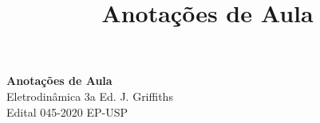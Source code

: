 \documentclass[11pt]{article}%
\theoremstyle{definition}
\begin{document}

\newcommand{\nota}[1]{%
\textcolor{red}{
#1
}}
\newcommand{\titulo}{Anotações de Aula}
\newcommand{\griffiths}{Eletrodinâmica 3a Ed. J. Griffiths}

\title{\titulo}

\thispagestyle{empty}

\begin{center}
{\LARGE \bf \titulo}\\
{\large Eletrodinâmica 3a Ed. J. Griffiths}\\
Edital 045-2020 EP-USP
\end{center}



\end{document}
